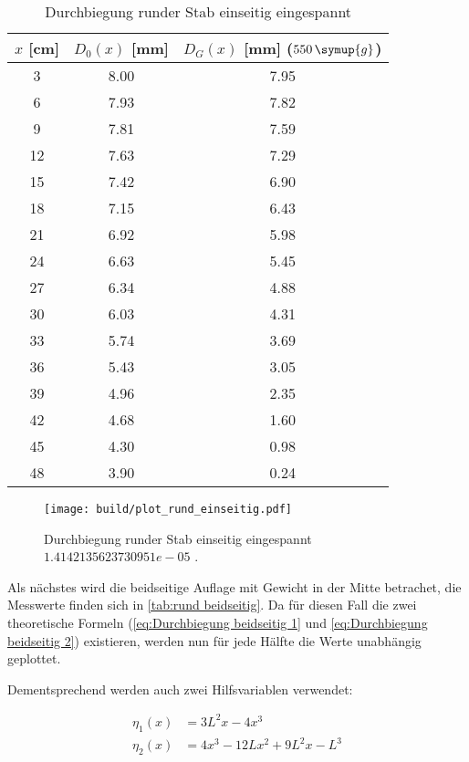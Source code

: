 \begin{table} [H]
  \centering
  \caption{Durchbiegung runder Stab einseitig eingespannt}
  \label{tab:rund einseitig}
  \begin{tabular}{S[table-format=2.0] S[table-format=2.0] S[table-format=2.0]}
    \toprule
    {$x$ [cm]} & {$D_{0}(x)$ [mm]} & {$D_{G}(x)$ [mm] ($550\,\symup{g}$)} \\
     & 8.00 & 7.95 \\
     6 & 7.93 & 7.82 \\
     9 & 7.81 & 7.59 \\
    12 & 7.63 & 7.29 \\
    15 & 7.42 & 6.90 \\ 
    18 & 7.15 & 6.43 \\
    21 & 6.92 & 5.98 \\
    24 & 6.63 & 5.45 \\
    27 & 6.34 & 4.88 \\
    30 & 6.03 & 4.31 \\
    33 & 5.74 & 3.69 \\
    36 & 5.43 & 3.05 \\
    39 & 4.96 & 2.35 \\
    42 & 4.68 & 1.60 \\
    45 & 4.30 & 0.98 \\
    48 & 3.90 & 0.24 \\ 
    \bottomrule
  \end{tabular}
\end{table}

\begin{figure} [H]
  \centering
  \texttt{[image: build/plot\_rund\_einseitig.pdf]}
  \caption{Durchbiegung runder Stab einseitig eingespannt $1.4142135623730951e-05$ .}
  \label{fig:rund_einseitig}
\end{figure}

Als nächstes wird die beidseitige Auflage mit Gewicht in der Mitte betrachet,
die Messwerte finden sich in \autoref{tab:rund beidseitig}.
Da für diesen Fall die zwei theoretische Formeln (\autoref{eq:Durchbiegung beidseitig 1} und \autoref{eq:Durchbiegung beidseitig 2}) existieren,
werden nun für jede Hälfte die Werte unabhängig geplottet.

Dementsprechend werden auch zwei Hilfsvariablen verwendet:

\begin{align}
  \eta_{1}(x)&=3L^{2}x-4x^{3}  \\
  \eta_{2}(x)&=4x^{3}-12Lx^{2}+9L^{2}x-L^{3}
\end{align}

